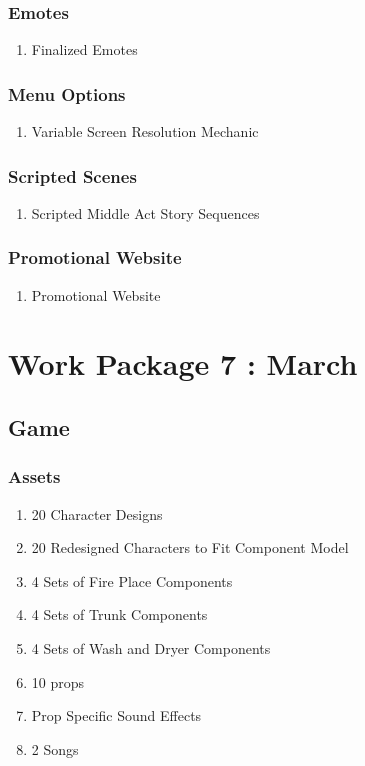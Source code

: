 \subsubsection{Emotes}
\begin{enumerate}
\item Finalized Emotes
\end{enumerate}
\subsubsection{Menu Options}
\begin{enumerate}
\item Variable Screen Resolution Mechanic
\end{enumerate}
\subsubsection{Scripted Scenes}
\begin{enumerate}
\item Scripted Middle Act Story Sequences
\end{enumerate}
\subsubsection{Promotional Website}
\begin{enumerate}
\item Promotional Website
\end{enumerate}


\section{Work Package 7 : March}
\subsection{Game}
\subsubsection{Assets}
\begin{enumerate}
\item 20 Character Designs
\item 20 Redesigned Characters to Fit Component Model
\item 4 Sets of Fire Place Components
\item 4 Sets of Trunk Components
\item 4 Sets of Wash and Dryer Components
\item 10 props
\item Prop Specific Sound Effects
\item 2 Songs
\end{enumerate}
